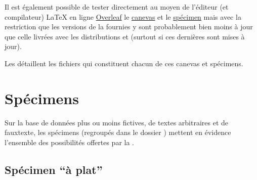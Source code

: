 Il est également possible de tester directement au moyen de l'éditeur (et
compilateur) \LaTeX{} en ligne%
%
%
%
%
\href{https://www.overleaf.com/}{Overleaf} le
\href{https://www.overleaf.com/latex/templates/template-of-a-thesis-written-with-yathesis-class/nhtmtthnqwtd}{canevas}
et le
\href{https://www.overleaf.com/latex/examples/sample-of-a-thesis-written-with-yathesis-class/nbcfvfqgnjfq}{spécimen}\enarborescence{}
mais avec la restriction que les versions de la \yatCl{} fournies y sont
probablement bien moins à jour que celle livrées avec les distributions
\texlive{} et \miktex{} (surtout si ces dernières sont mises à jour).

Les  détaillent les fichiers qui constituent
chacun de ces canevas et spécimens.




\section{Spécimens}
\label{sec-specimens}

Sur la base de données plus ou moins fictives, de textes arbitraires et de
\gls{fauxtexte}, les spécimens (regroupés dans le dossier )
mettent en évidence l'ensemble des possibilités offertes par la \yatCl{}.

\subsection{Spécimen \enquote{à plat}}
\label{sec-specimen-a-plat}
%

